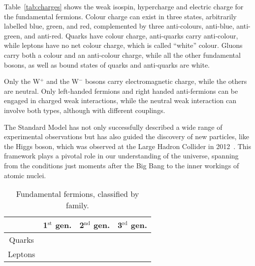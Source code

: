 Table~\ref{tab:charges} shows the weak isospin, hypercharge and electric charge for the fundamental fermions.
Colour charge can exist in three states, arbitrarily labelled blue, green, and red, complemented by three anti-colours, anti-blue, anti-green, and anti-red.
Quarks have colour charge, anti-quarks carry anti-colour, while leptons have no net colour charge, which is called ``white'' colour.
Gluons carry both a colour and an anti-colour charge, while all the other fundamental bosons, as well as bound states of quarks and anti-quarks are white.

Only the W$^+$ and the W$^-$ bosons carry electromagnetic charge, while the others are neutral.
Only left-handed fermions and right handed anti-fermions can be engaged in charged weak interactions, while the neutral weak interaction can involve both types, although with different couplings.

The Standard Model has not only successfully described a wide range of experimental observations but has also guided the discovery of new particles, like the Higgs boson, which was observed at the Large Hadron Collider in 2012~\cite{ATLASHiggsDiscovery, CMS-HIG-12-028}.
This framework plays a pivotal role in our understanding of the universe, spanning from the conditions just moments after the Big Bang to the inner workings of atomic nuclei.

\begin{table}[tbh]
	\centering
	\caption{Fundamental fermions, classified by family.}
	\label{tab:fermions}
	\begin{tabular}{ c c c c }
		\toprule
		 & 1$^{\text{st}}$ gen. & 2$^{\text{nd}}$ gen. & 3$^{\text{rd}}$ gen. \\%
		\midrule
		\multirow{2}{*}{Quarks}  & \PQu  & \PQc   & \PQt   \\%
		                         & \PQd  & \PQs   & \PQb   \\%
		\hline
		\multirow{2}{*}{Leptons} & \PGne & \PGnGm & \PGnGt \\%
		                         & \Pem  & \PGmm  & \PGtm  \\%
		\bottomrule
	\end{tabular}
\end{table}


